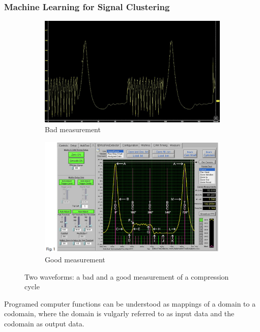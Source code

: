 \subsubsection{Machine Learning for Signal Clustering}
\begin{figure}[ht]
  \centering
  
  \begin{subfigure}[b]{0.48\linewidth}
    \includegraphics[width=\linewidth]{figures/bad.png}
    \caption{Bad measurement}
  \end{subfigure}
  \hfill
  \begin{subfigure}[b]{0.48\linewidth}
    \includegraphics[width=\linewidth]{figures/good.jpeg}
    \caption{Good measurement}
  \end{subfigure}

  \caption{Two waveforms: a bad and a good measurement of a compression cycle}
  \label{fig:waveforms_good_bad}
\end{figure}
Programed computer functions can be understood as mappings of a domain to a codomain, where the domain is vulgarly referred to as input data and the codomain as output data. 
